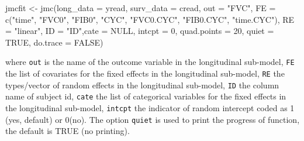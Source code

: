 \begin{example}
jmcfit <- jmc(long_data = yread, surv_data = cread, out = "FVC",
           FE = c("time", "FVC0", "FIB0", "CYC", "FVC0.CYC",
                  "FIB0.CYC", "time.CYC"),
           RE = "linear", ID = "ID",cate = NULL, intcpt = 0,
           quad.points = 20, quiet = TRUE, do.trace = FALSE)
\end{example}
where \texttt{out} is the name of the outcome variable in the longitudinal sub-model, \texttt{FE} the list of covariates for the fixed effects in the longitudinal sub-model, \texttt{RE} the types/vector of random effects in the longitudinal sub-model, \texttt{ID} the column name of subject id, \texttt{cate} the list of categorical variables for the fixed effects in the longitudinal sub-model, \texttt{intcpt} the indicator of random intercept coded as 1 (yes, default) or 0(no). The option \texttt{quiet} is used to print the progress of function, the default is TRUE (no printing).

